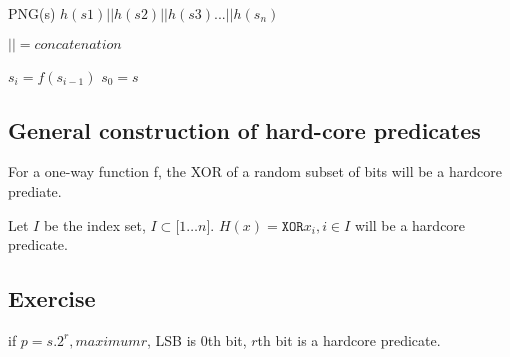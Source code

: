 PNG(s) $h(s1) || h(s2) || h(s3) ... || h(s_n)$

$|| = concatenation$

$s_i = f(s_{i - 1})$
$s_0 = s$


\subsection{General construction of hard-core predicates}

For a one-way function f, the XOR of a random subset of bits will be a hardcore
prediate.

Let $I$ be the index set, $I \subset \lbrack 1 \dots n \rbrack$.
$H(x) = \texttt{XOR} x_i, i \in I$ will be a hardcore predicate.


\subsection{Exercise}
if $p = s.2^r, maximum r$, LSB is $0$th bit, $r$th bit is a hardcore predicate.
